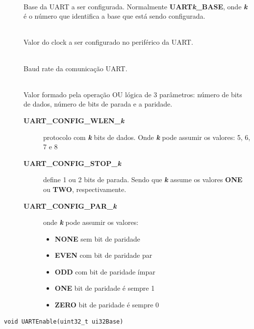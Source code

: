 \begin{description}
	\item []\hfill \\
	Base da UART a ser configurada. Normalmente \textbf{UART\emph{k}\_BASE}, onde \textbf{\emph{k}} é o número que identifica a base que está sendo configurada.
	
	\item []\hfill \\
	Valor do clock a ser configurado no periférico da UART.
	
	\item []\hfill \\
	Baud rate da comunicação UART.
	
	\item []\hfill \\
	Valor formado pela operação OU lógica de 3 parâmetros: número de bits de dados, número de bits de parada e a paridade.
	
	\begin{description}
		\item [\textbf{UART\_CONFIG\_WLEN\_\emph{k}}] protocolo com \textbf{\emph{k}} bits de dados. Onde \textbf{\emph{k}} pode assumir os valores: 5, 6, 7 e 8
		\item [\textbf{UART\_CONFIG\_STOP\_\emph{k}}] define 1 ou 2 bits de parada. Sendo que \textbf{\emph{k}} assume os valores \textbf{ONE} ou \textbf{TWO}, respectivamente.
		\item [\textbf{UART\_CONFIG\_PAR\_\emph{k}}] onde \textbf{\emph{k}} pode assumir os valores:
		\begin{itemize}
			\item \textbf{NONE} sem bit de paridade
			\item \textbf{EVEN} com bit de paridade par
			\item \textbf{ODD} com bit de paridade ímpar
			\item \textbf{ONE} bit de paridade é sempre 1
			\item \textbf{ZERO} bit de paridade é sempre 0
		\end{itemize}

	\end{description}
\end{description}

\begin{lstlisting}[style=funcao]
	void UARTEnable(uint32_t ui32Base)
\end{lstlisting}


